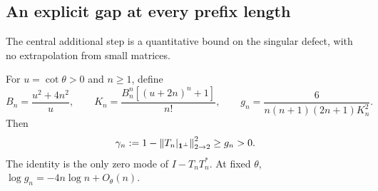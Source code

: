 \subsection{An explicit gap at every prefix length}
The central additional step is a quantitative bound on the singular defect, with no extrapolation from small matrices.
\begin{theorem}
For $u=\cot\theta>0$ and $n\ge1$, define
\[
 B_n=\frac{u^2+4n^2}{u},\qquad K_n=\frac{B_n^n[(u+2n)^n+1]}{n!},\qquad
 g_n=\frac6{n(n+1)(2n+1)K_n^2}.
\]
Then
\begin{equation}
 \gamma_n:=1-\left\lVert T_n|_{\mathbf1^\perp}\right\rVert_{2\to2}^2\ge g_n>0.\label{eq:allgap}
\end{equation}
The identity is the only zero mode of $I-T_nT_n^*$. At fixed $\theta$, $\log g_n=-4n\log n+O_\theta(n)$.
\end{theorem}

